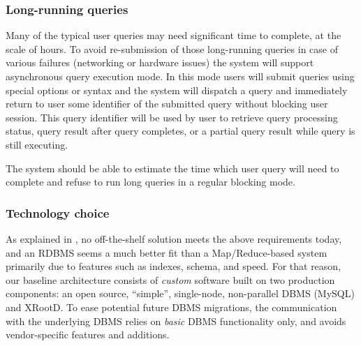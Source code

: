 \documentclass[DM,lsstdraft,toc]{lsstdoc}
\begin{document}
\subsubsection{Long-running queries}\label{long-running-queries}

Many of the typical user queries may need significant time to complete,
at the scale of hours. To avoid re-submission of those long-running
queries in case of various failures (networking or hardware issues) the
system will support asynchronous query execution mode. In this mode
users will submit queries using special options or syntax and the system
will dispatch a query and immediately return to user some identifier of
the submitted query without blocking user session. This query identifier
will be used by user to retrieve query processing status, query result
after query completes, or a partial query result while query is still
executing.

The system should be able to estimate the time which user query will
need to complete and refuse to run long queries in a regular blocking
mode.

\subsubsection{Technology choice}\label{technology-choice}

As explained in , no off-the-shelf solution meets the above
requirements today, and an RDBMS seems a much better fit than a Map/Reduce-based
system primarily due to features such as indexes, schema, and speed. For
that reason, our baseline architecture consists of \emph{custom} software
built on two production components: an open source, ``simple'', single-node,
non-parallel DBMS (MySQL) and XRootD. To ease potential future DBMS
migrations, the communication with the underlying DBMS relies on \emph{basic}
DBMS functionality only, and avoids vendor-specific features and additions.
\end{document}
